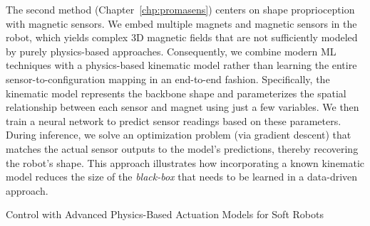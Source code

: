 The second method (Chapter~\ref{chp:promasens}) centers on shape proprioception with magnetic sensors. We embed multiple magnets and magnetic sensors in the robot, which yields complex 3D magnetic fields that are not sufficiently modeled by purely physics-based approaches. Consequently, we combine modern \gls{ML} techniques with a physics-based kinematic model rather than learning the entire sensor-to-configuration mapping in an end-to-end fashion. Specifically, the kinematic model represents the backbone shape and parameterizes the spatial relationship between each sensor and magnet using just a few variables. We then train a neural network to predict sensor readings based on these parameters. During inference, we solve an optimization problem (via gradient descent) that matches the actual sensor outputs to the model’s predictions, thereby recovering the robot’s shape. This approach illustrates how incorporating a known kinematic model reduces the size of the \emph{black-box} that needs to be learned in a data-driven approach.


\begin{contribution}\label{contrib:actuation_models}
    Control with Advanced Physics-Based Actuation Models for Soft Robots
\end{contribution}

